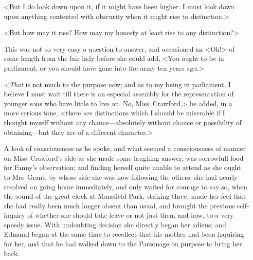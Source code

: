 <But I do look down upon it, if it might have been higher. I must look down upon anything contented with obscurity when it might rise to distinction.>

<But how may it rise? How may my honesty at least rise to any distinction?>

This was not so very easy a question to answer, and occasioned an <Oh!> of some length from the fair lady before she could add, <You ought to be in parliament, or you should have gone into the army ten years ago.>

<\textit{That}  is not much to the purpose now; and as to my being in parliament, I believe I must wait till there is an especial assembly for the representation of younger sons who have little to live on. No, Miss~Crawford,> he added, in a more serious tone, <there \textit{are}  distinctions which I should be miserable if I thought myself without any chance—absolutely without chance or possibility of obtaining—but they are of a different character.>

A look of consciousness as he spoke, and what seemed a consciousness of manner on Miss~Crawford's side as she made some laughing answer, was sorrowfull food for Fanny's observation; and finding herself quite unable to attend as she ought to Mrs~Grant, by whose side she was now following the others, she had nearly resolved on going home immediately, and only waited for courage to say so, when the sound of the great clock at Mansfield Park, striking three, made her feel that she had really been much longer absent than usual, and brought the previous self-inquiry of whether she should take leave or not just then, and how, to a very speedy issue. With undoubting decision she directly began her adieus; and Edmund began at the same time to recollect that his mother had been inquiring for her, and that he had walked down to the Parsonage on purpose to bring her back.

